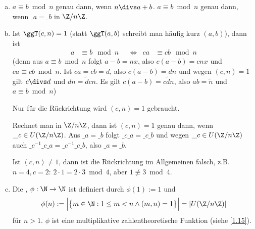 \begin{nt}
	\begin{enumerate}[a)]
		\item
			$a \equiv b \bmod n$ genau dann, wenn $n \divs a + b$.
			$a \equiv b \bmod n$ genau dann, wenn $\_a = \_b$ in $\Z / n\Z$.
		\item
			Ist $\ggT(c, n) = 1$ (statt $\ggT(a,b)$ schreibt man häufig kurz $(a,b)$), dann ist
			\begin{align*}
				a &\equiv b \mod n &
				&\iff&
				ca &\equiv cb \mod n
			\end{align*}
			(denn aus $a \equiv b \bmod n$ folgt $a -b = n x$, also $c(a-b) = cnx$ und $ca \equiv cb \bmod n$.
			Ist $ca = cb = d$, also $c(a-b) = dn$ und wegen $(c,n) = 1$ gilt $c\divs d$ und $dn = \tilde d c n$.
			Es gilt $c(a-b) = c \tilde d n$, also $ab = \tilde n$ und $a \equiv b \bmod n$)

			Nur für die Rückrichtung wird $(c,n) = 1$ gebraucht.

			Rechnet man in $\Z / n \Z$, dann ist $(c,n) = 1$ genau dann, wenn $\_c \in U(\Z / n \Z)$.
			Aus $\_a = \_b$ folgt $\_c \_a = \_c \_b$ und wegen $\_c \in U(\Z / n\Z)$ auch $\_c^{-1} \_c \_a = \_c^{-1} \_c \_b$, also $\_a = \_b$.

			Ist $(c, n) \neq 1$, dann ist die Rückrichtung im Allgemeinen falsch, z.B. $n = 4, c = 2$: $2 \cdot 1 = 2 \cdot 3 \bmod 4$, aber $1 \not\equiv 3 \bmod 4$.
		\item
			Die , $\phi: \N \to \N$ ist definiert durch $\phi(1) := 1$ und
			\[
				\phi(n)
				:= \Big| \big\{m \in \N : 1 \le m < n \land (m,n) = 1 \big\} \Big|
				= |U(\Z / n\Z)|
			\]
			für $n > 1$.
			$\phi$ ist eine multiplikative zahlentheoretische Funktion (siehe \ref{1.15}).
	\end{enumerate}
\end{nt}


